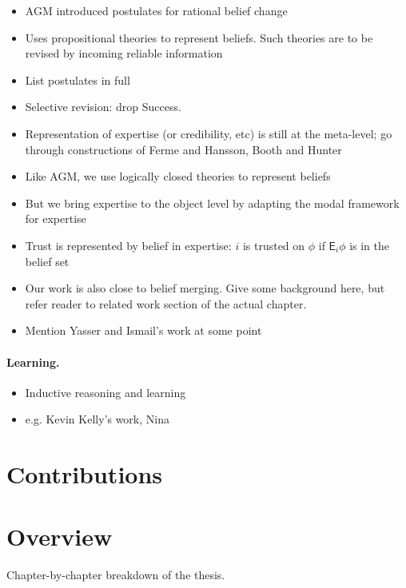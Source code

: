 \begin{notes}
    \begin{itemize}
        \item AGM introduced postulates for rational belief change
        \item Uses propositional theories to represent beliefs. Such theories
              are to be revised by incoming reliable information
        \item List postulates in full
        \item Selective revision: drop Success.
        \item Representation of expertise (or credibility, etc) is still at the
              meta-level; go through constructions of Ferme and Hansson, Booth
              and Hunter
        \item Like AGM, we use logically closed theories to represent beliefs
        \item But we bring expertise to the object level by adapting the modal
              framework for expertise
        \item Trust is represented by belief in expertise: $i$ is trusted on
            $\phi$ if $\mathsf{E}_i\phi$ is in the belief set
        \item Our work is also close to belief merging. Give some background
              here, but refer reader to related work section of the actual
              chapter.
        \item Mention Yasser and Ismail's work at some point
    \end{itemize}
\end{notes}

\paragraph{Learning.}

\begin{notes}
    \begin{itemize}
        \item Inductive reasoning and learning
        \item e.g. Kevin Kelly's work, Nina
    \end{itemize}
\end{notes}

\section{Contributions}


\section{Overview}

\begin{notes}
    Chapter-by-chapter breakdown of the thesis.
\end{notes}
